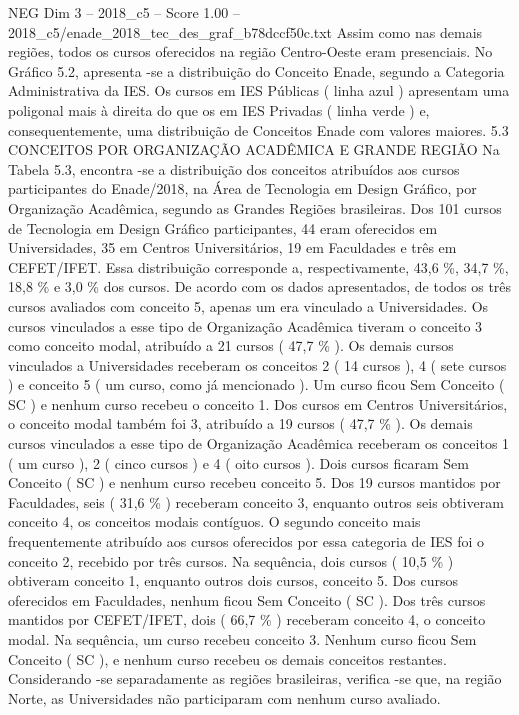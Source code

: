 \begin{textsample}{NEG Dim 3 – 2018\_c5 – Score 1.00 – 2018\_c5/enade\_2018\_tec\_des\_graf\_b78dccf50c.txt}
Assim como nas demais regiões, todos os cursos oferecidos na região Centro-Oeste eram presenciais.
No Gráfico 5.2, apresenta -se a distribuição do Conceito Enade, segundo a Categoria Administrativa da IES.
Os cursos em IES Públicas ( linha azul ) apresentam uma poligonal mais à direita do que os em IES Privadas ( linha verde ) e, consequentemente, uma distribuição de Conceitos Enade com valores maiores. 5.3 CONCEITOS POR ORGANIZAÇÃO ACADÊMICA E GRANDE REGIÃO Na Tabela 5.3, encontra -se a distribuição dos conceitos atribuídos aos cursos participantes do Enade/2018, na Área de Tecnologia em Design Gráfico, por Organização Acadêmica, segundo as Grandes Regiões brasileiras.
Dos 101 cursos de Tecnologia em Design Gráfico participantes, 44 eram oferecidos em Universidades, 35 em Centros Universitários, 19 em Faculdades e três em CEFET/IFET.
Essa distribuição corresponde a, respectivamente, 43,6 \%, 34,7 \%, 18,8 \% e 3,0 \% dos cursos.
De acordo com os dados apresentados, de todos os três cursos avaliados com conceito 5, apenas um era vinculado a Universidades.
Os cursos vinculados a esse tipo de Organização Acadêmica tiveram o conceito 3 como conceito modal, atribuído a 21 cursos ( 47,7 \% ).
Os demais cursos vinculados a Universidades receberam os conceitos 2 ( 14 cursos ), 4 ( sete cursos ) e conceito 5 ( um curso, como já mencionado ).
Um curso ficou Sem Conceito ( SC ) e nenhum curso recebeu o conceito 1.
Dos cursos em Centros Universitários, o conceito modal também foi 3, atribuído a 19 cursos ( 47,7 \% ).
Os demais cursos vinculados a esse tipo de Organização Acadêmica receberam os conceitos 1 ( um curso ), 2 ( cinco cursos ) e 4 ( oito cursos ).
Dois cursos ficaram Sem Conceito ( SC ) e nenhum curso recebeu conceito 5.
Dos 19 cursos mantidos por Faculdades, seis ( 31,6 \% ) receberam conceito 3, enquanto outros seis obtiveram conceito 4, os conceitos modais contíguos.
O segundo conceito mais frequentemente atribuído aos cursos oferecidos por essa categoria de IES foi o conceito 2, recebido por três cursos.
Na sequência, dois cursos ( 10,5 \% ) obtiveram conceito 1, enquanto outros dois cursos, conceito 5.
Dos cursos oferecidos em Faculdades, nenhum ficou Sem Conceito ( SC ).
Dos três cursos mantidos por CEFET/IFET, dois ( 66,7 \% ) receberam conceito 4, o conceito modal.
Na sequência, um curso recebeu conceito 3.
Nenhum curso ficou Sem Conceito ( SC ), e nenhum curso recebeu os demais conceitos restantes.
Considerando -se separadamente as regiões brasileiras, verifica -se que, na região Norte, as Universidades não participaram com nenhum curso avaliado.

\end{textsample}
